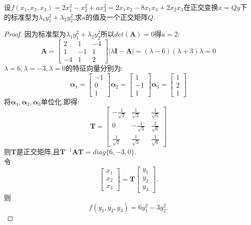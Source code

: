 \documentclass[lang=cn,11pt,normal]{elegantbook}
\begin{document}
	\begin{exercise}
		设$f(x_1,x_2,x_3)=2x_1^2-x_2^2+ax_3^2=2x_1x_2-8x_1x_3+2x_2x_3$在正交变换$x=Qy$下的标准型为$\lambda_1y_1^2+\lambda_2y_2^2$,求$a$的值及一个正交矩阵$Q$.
	\end{exercise}
	\begin{proof}
		因为标准型为$\lambda_1y_1^2+\lambda_2y_2^2$所以$det(\boldsymbol{A})=0$得$a=2$:
		$$
		\boldsymbol{A}=
		\begin{bmatrix}
		2&1&-4\\
		1&-1&1\\
		-4&1&2
		\end{bmatrix}
		|\lambda\boldsymbol{I}-\boldsymbol{A}|=(\lambda-6)(\lambda+3)\lambda=0
		$$
		$\lambda=6,\lambda=-3,\lambda=0$的特征向量分别为:
		$$\boldsymbol{\alpha}_1=
		\begin{bmatrix}
		-1\\0\\1
		\end{bmatrix}
		\boldsymbol{\alpha}_2=
		\begin{bmatrix}
		1\\-1\\1
		\end{bmatrix}
		\boldsymbol{\alpha}_3=
		\begin{bmatrix}
		1\\2\\1
		\end{bmatrix}
		$$
		将$\boldsymbol{\alpha}_1,\boldsymbol{\alpha}_2,\boldsymbol{\alpha}_3$单位化,即得:
		$$
		\boldsymbol{T}=
		\begin{bmatrix}
		-\frac{1}{\sqrt{2}}&\frac{1}{\sqrt{3}}&\frac{1}{\sqrt{6}}\\
		0&-\frac{1}{\sqrt{3}}&\frac{2}{\sqrt{6}}\\
		\frac{1}{\sqrt{2}}&\frac{1}{\sqrt{3}}&\frac{1}{\sqrt{6}}
		\end{bmatrix}
		$$
		则$\boldsymbol{T}$是正交矩阵,且$\boldsymbol{T}^{-1}\boldsymbol{A}\boldsymbol{T}=diag\{6,-3,0\}$.\\
		令
		$$
		\begin{bmatrix}
		x_1\\x_2\\x_3
		\end{bmatrix}
		=
		\boldsymbol{T}
		\begin{bmatrix}
		y_1\\y_2\\y_3
		\end{bmatrix}.
		$$
		则\\
		$$f(y_1,y_2,y_3)=6y_1^2-3y_2^2.$$
	\end{proof}
\end{document}
